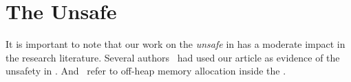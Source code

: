 
\chapter{The \java{} Unsafe \api{}} \label{cha:unsafe}


It is important to note that our work on the \emph{unsafe} \api{} in \java{} has a moderate impact in the research literature.
Several authors~
\cite{staicu_understanding_2017,jiang_unsupervised_2017,zhang_accepting_2016,saied_cooperative_2016,hora_when_2016,li_accessing_2016,holzinger_-depth_2016} had used our article as evidence of the unsafety in \java{}.
And~\cite{bruno_ng2c:_2017} refer to off-heap memory allocation inside the \jvm{}.
